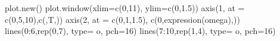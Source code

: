 \documentclass[
  letterpaper,
  DIV=11,
  numbers=noendperiod]{scrartcl}
\newenvironment{Shaded}{\begin{snugshade}}{\end{snugshade}}
\newcommand{\AttributeTok}[1]{\textcolor[rgb]{0.40,0.45,0.13}{#1}}
\newcommand{\DecValTok}[1]{\textcolor[rgb]{0.68,0.00,0.00}{#1}}
\newcommand{\FloatTok}[1]{\textcolor[rgb]{0.68,0.00,0.00}{#1}}
\newcommand{\FunctionTok}[1]{\textcolor[rgb]{0.28,0.35,0.67}{#1}}
\newcommand{\NormalTok}[1]{\textcolor[rgb]{0.00,0.23,0.31}{#1}}
\newcommand{\SpecialCharTok}[1]{\textcolor[rgb]{0.37,0.37,0.37}{#1}}
\newcommand{\StringTok}[1]{\textcolor[rgb]{0.13,0.47,0.30}{#1}}
\theoremstyle{plain}
\theoremstyle{plain}
\theoremstyle{definition}
\theoremstyle{definition}
\theoremstyle{remark}
\begin{document}
\begin{Shaded}
\begin{Highlighting}[]
\FunctionTok{plot.new}\NormalTok{()}
\FunctionTok{plot.window}\NormalTok{(}\AttributeTok{xlim=}\FunctionTok{c}\NormalTok{(}\DecValTok{0}\NormalTok{,}\DecValTok{11}\NormalTok{), }\AttributeTok{ylim=}\FunctionTok{c}\NormalTok{(}\DecValTok{0}\NormalTok{,}\FloatTok{1.5}\NormalTok{))}
\FunctionTok{axis}\NormalTok{(}\DecValTok{1}\NormalTok{, }\AttributeTok{at =} \FunctionTok{c}\NormalTok{(}\DecValTok{0}\NormalTok{,}\DecValTok{5}\NormalTok{,}\DecValTok{10}\NormalTok{),}\FunctionTok{c}\NormalTok{(}\StringTok{\textquotesingle{}\textquotesingle{}}\NormalTok{,}\StringTok{\textquotesingle{}T\textquotesingle{}}\NormalTok{,}\StringTok{\textquotesingle{}\textquotesingle{}}\NormalTok{))}
\FunctionTok{axis}\NormalTok{(}\DecValTok{2}\NormalTok{, }\AttributeTok{at =} \FunctionTok{c}\NormalTok{(}\DecValTok{0}\NormalTok{,}\DecValTok{1}\NormalTok{,}\FloatTok{1.5}\NormalTok{), }\FunctionTok{c}\NormalTok{(}\DecValTok{0}\NormalTok{,}\FunctionTok{expression}\NormalTok{(omega),}\StringTok{\textquotesingle{}\textquotesingle{}}\NormalTok{))}
\FunctionTok{lines}\NormalTok{(}\DecValTok{0}\SpecialCharTok{:}\DecValTok{6}\NormalTok{,}\FunctionTok{rep}\NormalTok{(}\DecValTok{0}\NormalTok{,}\DecValTok{7}\NormalTok{), }\AttributeTok{type=} \StringTok{\textquotesingle{}o\textquotesingle{}}\NormalTok{, }\AttributeTok{pch=}\DecValTok{16}\NormalTok{)}
\FunctionTok{lines}\NormalTok{(}\DecValTok{7}\SpecialCharTok{:}\DecValTok{10}\NormalTok{,}\FunctionTok{rep}\NormalTok{(}\DecValTok{1}\NormalTok{,}\DecValTok{4}\NormalTok{), }\AttributeTok{type=} \StringTok{\textquotesingle{}o\textquotesingle{}}\NormalTok{, }\AttributeTok{pch=}\DecValTok{16}\NormalTok{)}
\end{Highlighting}
\end{Shaded}
\end{document}
